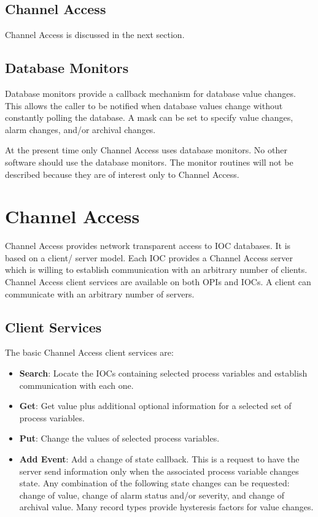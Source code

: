 \subsection{Channel Access}

Channel Access is discussed in the next section.

\subsection{Database Monitors}

Database monitors  provide a callback mechanism for database value changes. This allows the caller to be notified when 
database values change without constantly polling the database. A mask can be set to specify value changes, alarm  
changes, and/or archival changes. 

At the present time only Channel Access uses database monitors. No other software should use the database monitors.  
The monitor routines will not be described because they are of interest only to Channel Access.

\section{Channel Access}

Channel Access provides network transparent access to IOC databases. It is based on a client/ server model. Each IOC 
provides a Channel Access server which is willing to establish communication with an arbitrary number of clients. 
Channel Access client services are available on both OPIs and IOCs. A client can communicate with an arbitrary number 
of servers.

\subsection{Client Services}

The basic Channel Access client services are:

\begin{itemize}
\item \textbf{Search}:  Locate the IOCs containing selected process variables and establish communication with each one.

\item \textbf{Get}:  Get value plus additional optional information for a selected set of process variables.

\item \textbf{Put}:  Change the values of selected process variables.

\item \textbf{Add Event}: Add a change of state callback. This is a request to have the server send information only when the 
associated process variable changes state. Any combination of the following state changes can be requested: 
change of value, change of alarm status and/or severity, and change of archival value. Many record types provide 
hysteresis factors for value changes.
\end{itemize}

